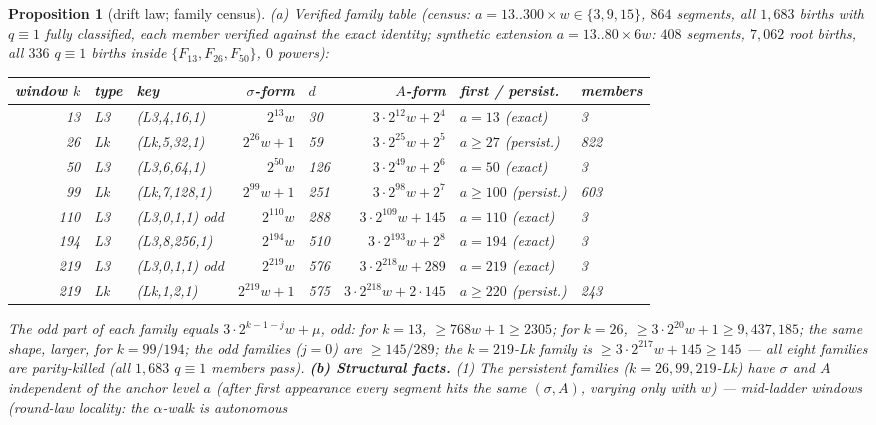 \documentclass[11pt]{amsart}
\newtheorem{proposition}[theorem]{Proposition}
\theoremstyle{definition}
\begin{document}
\begin{proposition}[drift law; family census]\label{prop:drift}
(a) \emph{Verified family table} (census: $a=13..300\times w\in\{3,9,15\}$,
$864$ segments, all $1{,}683$ births with $q\equiv1$ \emph{fully classified},
each member verified against the exact identity; synthetic extension
$a=13..80\times6w$: $408$ segments, $7{,}062$ root births, all $336$
$q\equiv1$ births inside $\{F_{13},F_{26},F_{50}\}$, $0$ powers):
\begin{center}\footnotesize\setlength{\tabcolsep}{3.5pt}
\begin{tabular}{rllrlrll}
\toprule
window $k$ & type & key & $\sigma$-form & $d$ & $A$-form & first / persist. & members\\
\midrule
13 & L3 & (L3,4,16,1) & $2^{13}w$ & 30 & $3\cdot2^{12}w+2^4$ &
$a{=}13$ (exact) & 3\\
26 & Lk & (Lk,5,32,1) & $2^{26}w{+}1$ & 59 & $3\cdot2^{25}w+2^5$ &
$a\ge27$ (persist.) & 822\\
50 & L3 & (L3,6,64,1) & $2^{50}w$ & 126 & $3\cdot2^{49}w+2^6$ &
$a{=}50$ (exact) & 3\\
99 & Lk & (Lk,7,128,1) & $2^{99}w{+}1$ & 251 & $3\cdot2^{98}w+2^7$ &
$a\ge100$ (persist.) & 603\\
110 & L3 & (L3,0,1,1) odd & $2^{110}w$ & 288 & $3\cdot2^{109}w+145$ &
$a{=}110$ (exact) & 3\\
194 & L3 & (L3,8,256,1) & $2^{194}w$ & 510 & $3\cdot2^{193}w+2^8$ &
$a{=}194$ (exact) & 3\\
219 & L3 & (L3,0,1,1) odd & $2^{219}w$ & 576 & $3\cdot2^{218}w+289$ &
$a{=}219$ (exact) & 3\\
219 & Lk & (Lk,1,2,1) & $2^{219}w{+}1$ & 575 & $3\cdot2^{218}w+2\cdot145$ &
$a\ge220$ (persist.) & 243\\
\bottomrule
\end{tabular}
\end{center}
The odd part of each family equals $3\cdot2^{k-1-j}w+\mu$, odd: for $k{=}13$,
$\ge768w+1\ge2305$; for $k{}=26$, $\ge3\cdot2^{20}w+1\ge9{,}437{,}185$; the
same shape, larger, for $k{=}99/194$; the odd families ($j{=}0$) are
$\ge145/289$; the $k{=}219$-Lk family is $\ge3\cdot2^{217}w+145\ge145$ ---
\emph{all eight families are parity-killed} (all $1{,}683$ $q\equiv1$ members
pass).
\textbf{(b) Structural facts.} (1) The persistent families ($k=26,99,219$-Lk)
have $\sigma$ and $A$ independent of the anchor level $a$ (after first
appearance every segment hits the same $(\sigma,A)$, varying only with $w$)
--- mid-ladder windows (round-law locality: the $\alpha$-walk is autonomous

\end{proposition}
\end{document}
